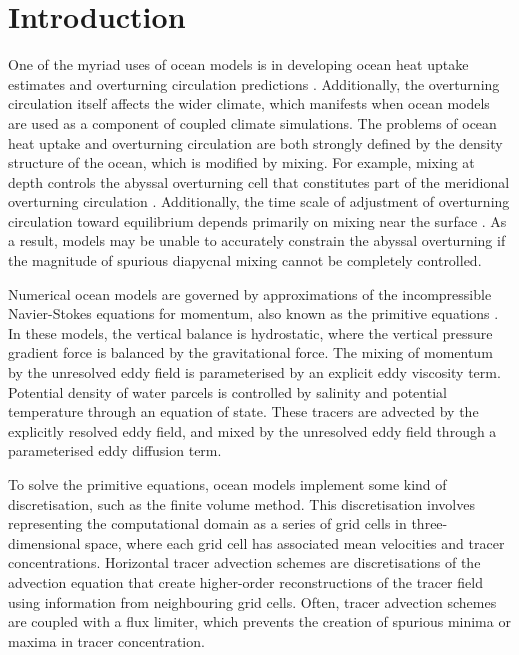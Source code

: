 \section{Introduction}

One of the myriad uses of ocean models is in developing ocean heat uptake estimates and overturning circulation predictions \citep{armour16}. Additionally, the overturning circulation itself affects the wider climate, which manifests when ocean models are used as a component of coupled climate simulations. The problems of ocean heat uptake and overturning circulation are both strongly defined by the density structure of the ocean, which is modified by mixing. For example, mixing at depth controls the abyssal overturning cell that constitutes part of the meridional overturning circulation \citep{mashayek15}. Additionally, the time scale of adjustment of overturning circulation toward equilibrium depends primarily on mixing near the surface \citep{vreugdenhil15}. As a result, models may be unable to accurately constrain the abyssal overturning if the magnitude of spurious diapycnal mixing cannot be completely controlled.


Numerical ocean models are governed by approximations of the incompressible Navier-Stokes equations for momentum, also known as the primitive equations \citep{griffies04}. In these models, the vertical balance is hydrostatic, where the vertical pressure gradient force is balanced by the gravitational force. The mixing of momentum by the unresolved eddy field is parameterised by an explicit eddy viscosity term. Potential density of water parcels is controlled by salinity and potential temperature through an equation of state. These tracers are advected by the explicitly resolved eddy field, and mixed by the unresolved eddy field through a parameterised eddy diffusion term.

To solve the primitive equations, ocean models implement some kind of discretisation, such as the finite volume method. This discretisation involves representing the computational domain as a series of grid cells in three-dimensional space, where each grid cell has associated mean velocities and tracer concentrations. Horizontal tracer advection schemes are discretisations of the advection equation that create higher-order reconstructions of the tracer field using information from neighbouring grid cells. Often, tracer advection schemes are coupled with a flux limiter, which prevents the creation of spurious minima or maxima in tracer concentration.

